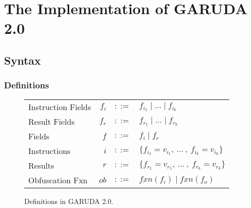 \documentclass[12pt, letterpaper]{article}
\def \sysname {\textsc{GARUDA 2.0}\xspace}
\begin{document}


  \section{The Implementation of \sysname}\label{sec:spec}

    \subsection{Syntax}\label{sec:spec:synt}
      \subsubsection{Definitions}\label{sec:spec:synt:defn}
        \begin{figure}
          \centering
          \begin{tabular}{l r c l}
            Instruction Fields & $f_{i}$ & $::=$ & $f_{i_{1}} \mid \dots \mid f_{i_{k}}$\\
            Result Fields      & $f_{r}$ & $::=$ & $f_{r_{1}} \mid \dots \mid f_{r_{k}}$\\
            Fields             & $f$     & $::=$ & $f_i \mid f_r$ \\
            Instructions       & $i$     & $::=$ & $\{f_{i_{1}} = v_{i_{1}} ,\ \dots\ ,\ f_{i_{k}} = v_{i_{k}}\}$\\
            Results            & $r$     & $::=$ & $\{f_{r_{1}} = v_{r_{1}} ,\ \dots\ ,\ f_{r_{k}} = v_{r_{k}}\}$\\
            Obfuscation Fxn    & $ob{}$  & $::=$ & $fxn(f_i) \mid fxn(f_o)$
          \end{tabular}
          \caption{Definitions in \sysname.}
          \label{fig:spec:synt:defn}
        \end{figure}
\end{document}
